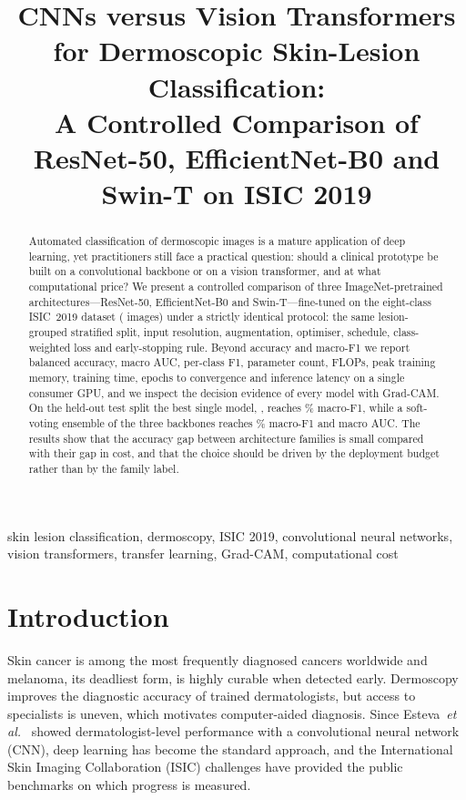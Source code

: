 \documentclass[conference]{IEEEtran}
\begin{document}
\title{CNNs versus Vision Transformers for Dermoscopic Skin-Lesion Classification:\\
A Controlled Comparison of ResNet-50, EfficientNet-B0 and Swin-T on ISIC 2019}

\author{
}

\maketitle

\begin{abstract}
Automated classification of dermoscopic images is a mature application of deep learning, yet
practitioners still face a practical question: should a clinical prototype be built on a
convolutional backbone or on a vision transformer, and at what computational price? We present a
controlled comparison of three ImageNet-pretrained architectures---ResNet-50, EfficientNet-B0 and
Swin-T---fine-tuned on the eight-class ISIC~2019 dataset (\Ntotal{} images) under a strictly
identical protocol: the same lesion-grouped stratified split, input resolution, augmentation,
optimiser, schedule, class-weighted loss and early-stopping rule. Beyond accuracy and macro-F1 we
report balanced accuracy, macro AUC, per-class F1, parameter count, FLOPs, peak training memory,
training time, epochs to convergence and inference latency on a single consumer GPU, and we
inspect the decision evidence of every model with Grad-CAM. On the held-out test split the best
single model, \BestModel{}, reaches \BestFone\% macro-F1, while a soft-voting ensemble of the
three backbones reaches \EnsFone\% macro-F1 and \EnsAuc{} macro AUC. The results show that the
accuracy gap between architecture families is small compared with their gap in cost, and that
the choice should be driven by the deployment budget rather than by the family label.
\end{abstract}

\begin{IEEEkeywords}
skin lesion classification, dermoscopy, ISIC 2019, convolutional neural networks, vision
transformers, transfer learning, Grad-CAM, computational cost
\end{IEEEkeywords}

\section{Introduction}
Skin cancer is among the most frequently diagnosed cancers worldwide and melanoma, its deadliest
form, is highly curable when detected early. Dermoscopy improves the diagnostic accuracy of
trained dermatologists, but access to specialists is uneven, which motivates computer-aided
diagnosis. Since Esteva~\textit{et al.}~\cite{esteva2017dermatologist} showed dermatologist-level
performance with a convolutional neural network (CNN), deep learning has become the standard
approach, and the International Skin Imaging Collaboration (ISIC) challenges
\cite{codella2018isic,tschandl2018ham10000,combalia2019bcn20000} have provided the public
benchmarks on which progress is measured.
\end{document}
